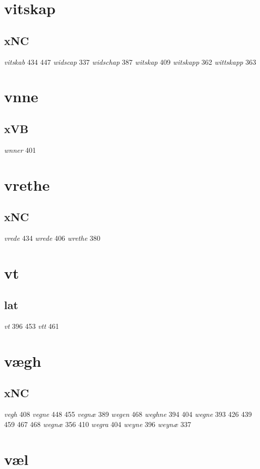 \documentclass[a4paper,twocolumn]{article}
\begin{document}
\section{vitskap}
\label{sec:orgc2fbd5e}
\subsection{xNC}
\label{sec:org051bf5f}
\emph{vitskab} 434 447 \emph{widscap} 337 \emph{widschap} 387 \emph{witskap} 409 \emph{witskapp} 362 \emph{wittskapp} 363 
\section{vnne}
\label{sec:org14e89cd}
\subsection{xVB}
\label{sec:orgb9d48d4}
\emph{wnner} 401 
\section{vrethe}
\label{sec:orgb72eaf3}
\subsection{xNC}
\label{sec:org3a83cb5}
\emph{vrede} 434 \emph{wrede} 406 \emph{wrethe} 380 
\section{vt}
\label{sec:org59077c1}
\subsection{lat}
\label{sec:org624cd03}
\emph{vt} 396 453 \emph{vtt} 461 
\section{vægh}
\label{sec:org6c4443b}
\subsection{xNC}
\label{sec:orgb9f64ab}
\emph{vegh} 408 \emph{vegne} 448 455 \emph{vegnæ} 389 \emph{wegen} 468 \emph{weghne} 394 404 \emph{wegne} 393 426 439 459 467 468 \emph{wegnæ} 356 410 \emph{wegra} 404 \emph{weyne} 396 \emph{weynæ} 337 
\section{væl}
\label{sec:org7e7df03}
\end{document}
